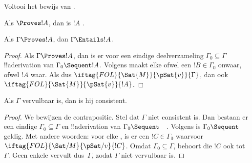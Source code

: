 \documentclass[openany]{memoir}
\begin{document}
\begin{prob}
Voltooi het bewijs van .
\end{prob}
\tagendprob

\begin{cor}
Als $\Proves !A$, dan is $!A$ .
\end{cor}

\begin{cor}
Als $\Gamma \Proves !A$, dan $\Gamma \Entails !A$.
\end{cor}

\begin{proof}
Als $\Gamma \Proves !A$, dan is er voor een eindige deelverzameling
$\Gamma_0 \subseteq \Gamma$ !!a{derivation} van $\Gamma_0 \Sequent
!A$. Volgens  maakt elke
ofwel een $!B \in \Gamma_0$ onwaar, ofwel $!A$ waar. Als dus
$\iftag{FOL}{\Sat{M}}{\pSat{v}}{\Gamma}$, dan ook
$\iftag{FOL}{\Sat{M}}{\pSat{v}}{!A}$.
\end{proof}

\begin{cor}
Als $\Gamma$ vervulbaar is, dan is hij consistent.
\end{cor}

\begin{proof}
We bewijzen de contrapositie. Stel dat $\Gamma$ niet consistent is.
Dan bestaan er een eindige $\Gamma_0 \subseteq \Gamma$ en
!!a{derivation} van $\Gamma_0 \Sequent \quad$. Volgens
 is $\Gamma_0 \Sequent \quad$ geldig.
Met andere woorden: voor elke
,
is er een $!C \in \Gamma_0$ waarvoor
$\iftag{FOL}{\Sat/{M}}{\pSat/{v}}{!C}$. Omdat $\Gamma_0 \subseteq
\Gamma$, behoort die $!C$ ook tot~$\Gamma$. Geen enkele
 vervult dus~$\Gamma$, zodat
$\Gamma$ niet vervulbaar is.
\end{proof}
\endgroup

\begingroup
\def\olfilename{OLP-0082}
\def\olfilepath{content/first-order-logic/sequent-calculus/}
\hypertarget{unit-OLP-0082}{}
\end{document}
